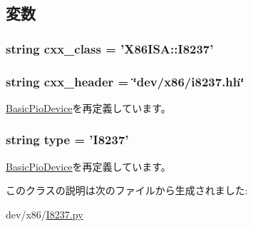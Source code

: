 \subsection{変数}
\hypertarget{classI8237_1_1I8237_a58cd55cd4023648e138237cfc0822ae3}{
\subsubsection[{cxx\_\-class}]{\setlength{\rightskip}{0pt plus 5cm}string {\bf cxx\_\-class} = '{\bf X86ISA::I8237}'}}
\label{classI8237_1_1I8237_a58cd55cd4023648e138237cfc0822ae3}
\hypertarget{classI8237_1_1I8237_a17da7064bc5c518791f0c891eff05fda}{
\subsubsection[{cxx\_\-header}]{\setlength{\rightskip}{0pt plus 5cm}string {\bf cxx\_\-header} = \char`\"{}dev/x86/i8237.hh\char`\"{}}}
\label{classI8237_1_1I8237_a17da7064bc5c518791f0c891eff05fda}


\hyperlink{classDevice_1_1BasicPioDevice_a17da7064bc5c518791f0c891eff05fda}{BasicPioDevice}を再定義しています。\hypertarget{classI8237_1_1I8237_acce15679d830831b0bbe8ebc2a60b2ca}{
\subsubsection[{type}]{\setlength{\rightskip}{0pt plus 5cm}string {\bf type} = '{\bf I8237}'}}
\label{classI8237_1_1I8237_acce15679d830831b0bbe8ebc2a60b2ca}


\hyperlink{classDevice_1_1BasicPioDevice_acce15679d830831b0bbe8ebc2a60b2ca}{BasicPioDevice}を再定義しています。

このクラスの説明は次のファイルから生成されました:\begin{DoxyCompactItemize}
\item 
dev/x86/\hyperlink{I8237_8py}{I8237.py}\end{DoxyCompactItemize}

